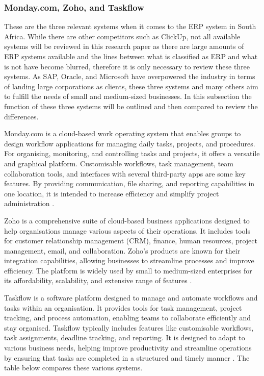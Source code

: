 \subsubsection{Monday.com, Zoho, and Taskflow}
\par{These are the three relevant systems when it comes to the ERP system in South Africa. While there are other competitors such as ClickUp, not all available systems will be reviewed in this research paper as there are large amounts of ERP systems available and the lines between what is classified as ERP and what is not have become blurred, therefore it is only necessary to review these three systems. As SAP, Oracle, and Microsoft have overpowered the industry in terms of landing large corporations as clients, these three systems and many others aim to fulfill the needs of small and medium-sized businesses. In this subsection the function of these three systems will be outlined and then compared to review the differences.

Monday.com is a cloud-based work operating system that enables groups to design workflow applications for managing daily tasks, projects, and procedures. For organising, monitoring, and controlling tasks and projects, it offers a versatile and graphical platform. Customisable workflows, task management, team collaboration tools, and interfaces with several third-party apps are some key features. By providing communication, file sharing, and reporting capabilities in one location, it is intended to increase efficiency and simplify project administration \citep{monday.com}.

Zoho is a comprehensive suite of cloud-based business applications designed to help organisations manage various aspects of their operations. It includes tools for customer relationship management (CRM), finance, human resources, project management, email, and collaboration. Zoho's products are known for their integration capabilities, allowing businesses to streamline processes and improve efficiency. The platform is widely used by small to medium-sized enterprises for its affordability, scalability, and extensive range of features \citep{zoho}.

Taskflow is a software platform designed to manage and automate workflows and tasks within an organisation. It provides tools for task management, project tracking, and process automation, enabling teams to collaborate efficiently and stay organised. Taskflow typically includes features like customisable workflows, task assignments, deadline tracking, and reporting. It is designed to adapt to various business needs, helping improve productivity and streamline operations by ensuring that tasks are completed in a structured and timely manner \citep{taskflow}. The table below compares these various systems.}
